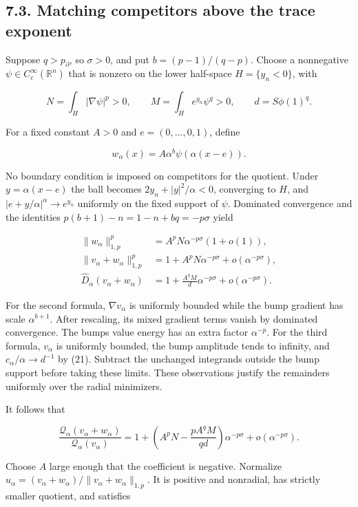 \documentclass[11pt]{article}
\begin{document}
\subsection{7.3. Matching competitors above the trace
exponent}\label{matching-competitors-above-the-trace-exponent}

Suppose \(q>p_\partial\), so \(\sigma>0\), and put \(b=(p-1)/(q-p)\).
Choose a nonnegative \(\psi\in C_c^\infty(\mathbb R^n)\) that is nonzero
on the lower half-space \(H=\{y_n<0\}\), with

\[
N=\int_H|\nabla\psi|^p>0,\qquad
M=\int_H e^{y_n}\psi^q>0,\qquad d=S\phi(1)^q.
\]

For a fixed constant \(A>0\) and \(e=(0,\ldots,0,1)\), define

\[
w_\alpha(x)=A\alpha^b\psi(\alpha(x-e)).
\tag{7.15}
\]

No boundary condition is imposed on competitors for the quotient. Under
\(y=\alpha(x-e)\) the ball becomes \(2y_n+|y|^2/\alpha<0\), converging
to \(H\), and \(|e+y/\alpha|^\alpha\to e^{y_n}\) uniformly on the fixed
support of \(\psi\). Dominated convergence and the identities
\(p(b+1)-n=1-n+bq=-p\sigma\) yield

\[
\begin{aligned}
\|w_\alpha\|_{1,p}^p
 &=A^pN\alpha^{-p\sigma}(1+o(1)),\\
\|v_\alpha+w_\alpha\|_{1,p}^p
 &=1+A^pN\alpha^{-p\sigma}+o(\alpha^{-p\sigma}),\\
\widehat D_\alpha(v_\alpha+w_\alpha)
 &=1+\frac{A^qM}{d}\alpha^{-p\sigma}
   +o(\alpha^{-p\sigma}).
\end{aligned}
\tag{7.16}
\]

For the second formula, \(\nabla v_\alpha\) is uniformly bounded while
the bump gradient has scale \(\alpha^{b+1}\). After rescaling, its mixed
gradient terms vanish by dominated convergence. The
bump\textquotesingle s value energy has an extra factor \(\alpha^{-p}\).
For the third formula, \(v_\alpha\) is uniformly bounded, the bump
amplitude tends to infinity, and \(c_\alpha/\alpha\to d^{-1}\) by (21).
Subtract the unchanged integrands outside the bump support before taking
these limits. These observations justify the remainders uniformly over
the radial minimizers.

It follows that

\[
\frac{\mathcal Q_\alpha(v_\alpha+w_\alpha)}{\mathcal Q_\alpha(v_\alpha)}
=1+\left(A^pN-\frac{pA^qM}{qd}\right)\alpha^{-p\sigma}
 +o(\alpha^{-p\sigma}).
\tag{7.17}
\]

Choose \(A\) large enough that the coefficient is negative. Normalize
\(u_\alpha=(v_\alpha+w_\alpha)/\|v_\alpha+w_\alpha\|_{1,p}\). It is
positive and nonradial, has strictly smaller quotient, and satisfies
\end{document}

